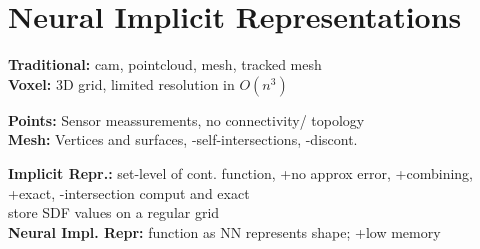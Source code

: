 \section{Neural Implicit Representations}
\textbf{Traditional:} cam, pointcloud, mesh, tracked mesh\\

\textbf{Voxel:} 3D grid, limited resolution in $O(n^3)$\\

\textbf{Points:} Sensor meassurements, no connectivity/ topology\\

\textbf{Mesh:} Vertices and surfaces, -self-intersections, -discont.\\

\textbf{Implicit Repr.:} set-level of cont. function, +no approx error, +combining, +exact, -intersection comput and exact\\
store SDF values on a regular grid\\
\textbf{Neural Impl. Repr:} function as NN represents shape; +low memory\\

